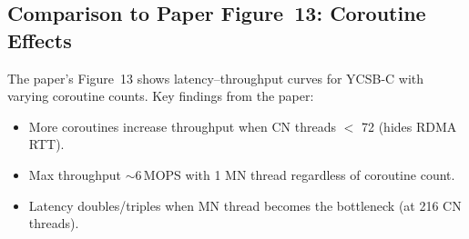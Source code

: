 \documentclass[11pt,a4paper]{article}
\begin{document}
\subsection{Comparison to Paper Figure~13: Coroutine Effects}

The paper's Figure~13 shows latency--throughput curves for YCSB-C with varying coroutine counts. Key findings from the paper:
\begin{itemize}[nosep]
  \item More coroutines increase throughput when CN threads $<$ 72 (hides RDMA RTT).
  \item Max throughput $\sim$6\,MOPS with 1 MN thread regardless of coroutine count.
  \item Latency doubles/triples when MN thread becomes the bottleneck (at 216 CN threads).
\end{itemize}
\end{document}
